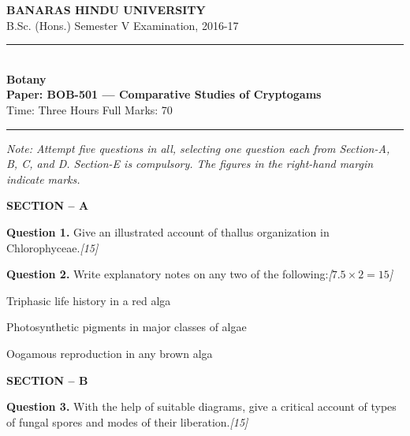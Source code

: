 \documentclass[11pt,a4paper]{article}
\newcommand{\pts}[1]{\hfill   \textit{[#1]}}
\begin{document}
\begin{center}
  {\large\bfseries BANARAS HINDU UNIVERSITY}\\[2pt]
  {\normalsize B.Sc. (Hons.) Semester V Examination, 2016-17}\\[6pt]
  \rule{0.8\linewidth}{0.5pt}\\[6pt]
  {\large\bfseries Botany}\\[4pt]
  {\large\bfseries Paper: BOB-501 --- Comparative Studies of Cryptogams}\\[4pt]
  {\normalsize Time: Three Hours \hfill Full Marks: 70}
\end{center}

\rule{\linewidth}{0.4pt}

\smallskip



\noindent   \textit{Note: Attempt five questions in all, selecting one question each from Section-A, B, C, and D. Section-E is compulsory. The figures in the right-hand margin indicate marks.}

\bigskip

\begin{center}
   \textbf{SECTION -- A}
\end{center}

\medskip


\noindent   \textbf{Question 1.} Give an illustrated account of thallus organization in Chlorophyceae.\pts{15}

\medskip


\noindent   \textbf{Question 2.} Write explanatory notes on any two of the following:\pts{$7.5  \times 2 = 15$}

\begin{parts}
  \item Triphasic life history in a red alga
  \item Photosynthetic pigments in major classes of algae
  \item Oogamous reproduction in any brown alga
\end{parts}

\bigskip

\begin{center}
   \textbf{SECTION -- B}
\end{center}

\medskip


\noindent   \textbf{Question 3.} With the help of suitable diagrams, give a critical account of types of fungal spores and modes of their liberation.\pts{15}

\medskip
\end{document}
